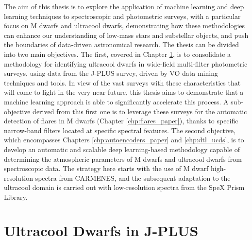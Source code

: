 The aim of this thesis is to explore the application of machine learning and deep learning techniques to spectroscopic and photometric surveys, with a particular focus on M dwarfs and ultracool dwarfs, demonstrating how these methodologies can enhance our understanding of low-mass stars and substellar objects, and push the boundaries of data-driven astronomical research. The thesis can be divided into two main objectives. The first, covered in Chapter \ref{chp:ucds_paper}, is to consolidate a methodology for identifying ultracool dwarfs in wide-field multi-filter photometric surveys, using data from the J-PLUS survey, driven by VO data mining techniques and tools. In view of the vast surveys with these characteristics that will come to light in the very near future, this thesis aims to demonstrate that a machine learning approach is able to significantly accelerate this process. A sub-objective derived from this first one is to leverage these surveys for the automatic detection of flares in M dwarfs (Chapter \ref{chp:flares_paper}), thanks to specific narrow-band filters located at specific spectral features. The second objective, which encompasses Chapters \ref{chp:autoencoders_paper} and \ref{chp:dtl_ucds}, is to develop an automatic and scalable deep learning-based methodology capable of determining the atmospheric parameters of M dwarfs and ultracool dwarfs from spectroscopic data. The strategy here starts with the use of M dwarf high-resolution spectra from CARMENES, and the subsequent adaptation to the ultracool domain is carried out with low-resolution spectra from the SpeX Prism Library.

\chapter{Ultracool Dwarfs in J-PLUS}
\label{chp:ucds_paper}





